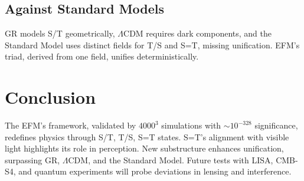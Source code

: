 \documentclass[11pt]{article}
\begin{document}
\subsection{Against Standard Models}
GR models S/T geometrically, \(\Lambda\)CDM requires dark components, and the Standard Model uses distinct fields for T/S and S=T, missing unification. EFM’s triad, derived from one field, unifies deterministically.

\section{Conclusion}
The EFM’s framework, validated by \(4000^3\) simulations with \(\sim 10^{-328}\) significance, redefines physics through S/T, T/S, S=T states. S=T’s alignment with visible light highlights its role in perception. New substructure enhances unification, surpassing GR, \(\Lambda\)CDM, and the Standard Model. Future tests with LISA, CMB-S4, and quantum experiments will probe deviations in lensing and interference.

\appendix
\end{document}
